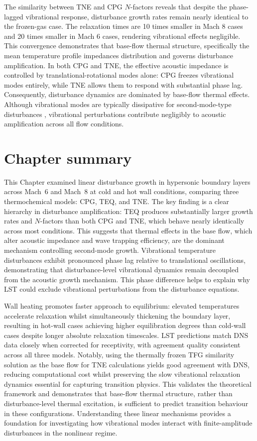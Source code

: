 The similarity between \gls{TNE} and \gls{CPG} $N$-factors reveals that despite the phase-lagged vibrational response, disturbance growth rates remain nearly identical to the frozen-gas case. The relaxation times are 10 times smaller in Mach 8 cases and 20 times smaller in Mach 6 cases, rendering vibrational effects negligible. This convergence demonstrates that base-flow thermal structure, specifically the mean temperature profile impedances distribution and governs disturbance amplification. In both \gls{CPG} and \gls{TNE}, the effective acoustic impedance is controlled by translational-rotational modes alone: \gls{CPG} freezes vibrational modes entirely, while \gls{TNE} allows them to respond with substantial phase lag. Consequently, disturbance dynamics are dominated by base-flow thermal effects. Although vibrational modes are typically dissipative for second-mode-type disturbances \citep{Wagnild2012,BitterShepherd2015}, vibrational perturbations contribute negligibly to acoustic amplification across all flow conditions.

\section*{Chapter summary}
This Chapter examined linear disturbance growth in hypersonic boundary layers across Mach~6 and Mach~8 at cold and hot wall conditions, comparing three thermochemical models: \gls{CPG}, \gls{TEQ}, and \gls{TNE}. The key finding is a clear hierarchy in disturbance amplification: \gls{TEQ} produces substantially larger growth rates and $N$-factors than both \gls{CPG} and \gls{TNE}, which behave nearly identically across most conditions. This suggests that thermal effects in the base flow, which alter acoustic impedance and wave trapping efficiency, are the dominant mechanism controlling second-mode growth. Vibrational temperature disturbances exhibit pronounced phase lag relative to translational oscillations, demonstrating that disturbance-level vibrational dynamics remain decoupled from the acoustic growth mechanism. This phase difference helps to explain why \gls{LST} could exclude vibrational perturbations from the disturbance equations.

Wall heating promotes faster approach to equilibrium: elevated temperatures accelerate relaxation whilst simultaneously thickening the boundary layer, resulting in hot-wall cases achieving higher equilibration degrees than cold-wall cases despite longer absolute relaxation timescales. \gls{LST} predictions match \gls{DNS} data closely when corrected for receptivity, with agreement quality consistent across all three models. Notably, using the thermally frozen \gls{TFG} similarity solution as the base flow for \gls{TNE} calculations yields good agreement with \gls{DNS}, reducing computational cost whilst preserving the slow vibrational relaxation dynamics essential for capturing transition physics. This validates the theoretical framework and demonstrates that base-flow thermal structure, rather than disturbance-level thermal excitation, is sufficient to predict transition behaviour in these configurations. Understanding these linear mechanisms provides a foundation for investigating how vibrational modes interact with finite-amplitude disturbances in the nonlinear regime.

